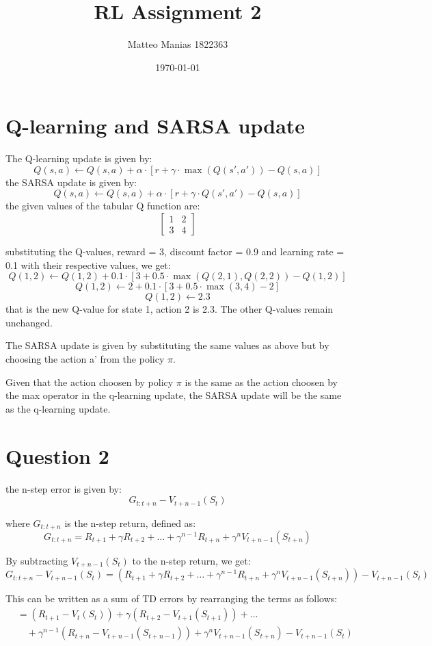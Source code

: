 \documentclass{article}
\title{RL Assignment 2}
\author{Matteo Manias 1822363}
\date{\today}  %
\begin{document}
\maketitle

\section{Q-learning and SARSA update}
The Q-learning update is given by:
\[
Q(s,a) \leftarrow Q(s,a) + \alpha \cdot [r + \gamma \cdot \max(Q(s',a')) - Q(s,a)]
\]
the SARSA update is given by:
\[
Q(s,a) \leftarrow Q(s,a) + \alpha \cdot [r + \gamma \cdot Q(s',a') - Q(s,a)]
\]
the given values of the tabular Q function are:
\[
\begin{bmatrix}
1 & 2 \\
3 & 4
\end{bmatrix}
\]



substituting the Q-values, reward = 3, discount factor = 0.9 and learning rate = 0.1 with their respective values, we get:
\[
Q(1,2) \leftarrow Q(1,2) + 0.1 \cdot [3 + 0.5 \cdot \max(Q(2,1),Q(2,2)) - Q(1,2)]
\]
\[
Q(1,2) \leftarrow 2 + 0.1 \cdot [3 + 0.5 \cdot \max(3,4) - 2]
\]
\[
Q(1,2) \leftarrow 2.3
\]
that is the new Q-value for state 1, action 2 is 2.3. The other Q-values remain unchanged.

The SARSA update is given by substituting the same values as above but by choosing the action a' from the policy $\pi$.

Given that the action choosen by policy $\pi$ is the same as the action choosen by the max operator in the q-learning update,
the SARSA update will be the same as the q-learning update.


\section{Question 2}
the n-step error is given by:
\[ G_{t:t+n} - V_{t+n-1}(S_t) \]

where \( G_{t:t+n} \) is the n-step return, defined as:
\[
G_{t:t+n} = R_{t+1}
+ \gamma R_{t+2}
+ \ldots
+ \gamma^{n-1} R_{t+n}
+ \gamma^n V_{t+n-1}(S_{t+n})
\]

By subtracting \( V_{t+n-1}(S_t) \) to the n-step return, we get:
\[ 
G_{t:t+n} - V_{t+n-1}(S_t) = (R_{t+1} + \gamma R_{t+2}
+ \ldots
+ \gamma^{n-1} R_{t+n} + \gamma^n V_{t+n-1}(S_{t+n}))
- V_{t+n-1}(S_t)
\]

This can be written as a sum of TD errors by rearranging the terms as follows:
\begin{align*}
&= (R_{t+1} - V_{t}(S_t)) + \gamma(R_{t+2} - V_{t+1}(S_{t+1})) + \ldots \\
&\quad + \gamma^{n-1}(R_{t+n} - V_{t+n-1}(S_{t+n-1})) + \gamma^n V_{t+n-1}(S_{t+n}) - V_{t+n-1}(S_t)
\end{align*}
\end{document}
